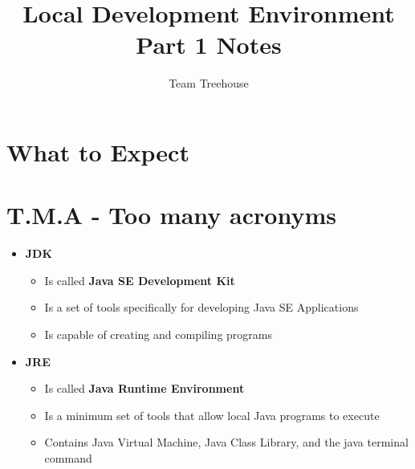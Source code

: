\documentclass[12pt]{article}
\begin{document}
\title{Local Development Environment Part 1 Notes}
\author{Team Treehouse}
\maketitle

\section{What to Expect}

\bigskip

\section{T.M.A - Too many acronyms}

\bigskip

\begin{itemize}
    \item \textbf{JDK}
    \begin{itemize}
        \item Is called \textbf{Java SE Development Kit}
        \item Is a set of tools specifically for developing Java SE Applications
        \item Is capable of creating and compiling programs
    \end{itemize}
    \item \textbf{JRE}
    \begin{itemize}
        \item Is called \textbf{Java Runtime Environment}
        \item Is a minimum set of tools that allow local Java programs to execute
        \item Contains Java Virtual Machine, Java Class Library, and the java
        terminal command
    \end{itemize}
\end{itemize}
\end{document}
